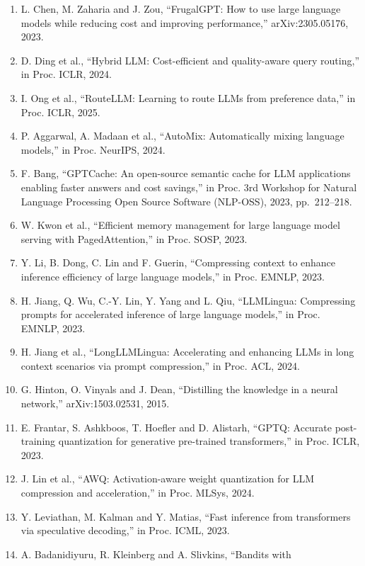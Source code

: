 \documentclass[
  10pt,
]{article}
\providecommand{\tightlist}{%
  \setlength{\itemsep}{0pt}\setlength{\parskip}{0pt}}
\begin{document}
\begin{enumerate}
\def\labelenumi{\arabic{enumi}.}
\tightlist
\item
  L. Chen, M. Zaharia and J. Zou, ``FrugalGPT: How to use large language
  models while reducing cost and improving performance,''
  arXiv:2305.05176, 2023.
\item
  D. Ding et al., ``Hybrid LLM: Cost-efficient and quality-aware query
  routing,'' in Proc. ICLR, 2024.
\item
  I. Ong et al., ``RouteLLM: Learning to route LLMs from preference
  data,'' in Proc. ICLR, 2025.
\item
  P. Aggarwal, A. Madaan et al., ``AutoMix: Automatically mixing
  language models,'' in Proc. NeurIPS, 2024.
\item
  F. Bang, ``GPTCache: An open-source semantic cache for LLM
  applications enabling faster answers and cost savings,'' in Proc. 3rd
  Workshop for Natural Language Processing Open Source Software
  (NLP-OSS), 2023, pp.~212--218.
\item
  W. Kwon et al., ``Efficient memory management for large language model
  serving with PagedAttention,'' in Proc. SOSP, 2023.
\item
  Y. Li, B. Dong, C. Lin and F. Guerin, ``Compressing context to enhance
  inference efficiency of large language models,'' in Proc. EMNLP, 2023.
\item
  H. Jiang, Q. Wu, C.-Y. Lin, Y. Yang and L. Qiu, ``LLMLingua:
  Compressing prompts for accelerated inference of large language
  models,'' in Proc. EMNLP, 2023.
\item
  H. Jiang et al., ``LongLLMLingua: Accelerating and enhancing LLMs in
  long context scenarios via prompt compression,'' in Proc. ACL, 2024.
\item
  G. Hinton, O. Vinyals and J. Dean, ``Distilling the knowledge in a
  neural network,'' arXiv:1503.02531, 2015.
\item
  E. Frantar, S. Ashkboos, T. Hoefler and D. Alistarh, ``GPTQ: Accurate
  post-training quantization for generative pre-trained transformers,''
  in Proc. ICLR, 2023.
\item
  J. Lin et al., ``AWQ: Activation-aware weight quantization for LLM
  compression and acceleration,'' in Proc. MLSys, 2024.
\item
  Y. Leviathan, M. Kalman and Y. Matias, ``Fast inference from
  transformers via speculative decoding,'' in Proc. ICML, 2023.
\item
  A. Badanidiyuru, R. Kleinberg and A. Slivkins, ``Bandits with

\end{enumerate}
\end{document}
